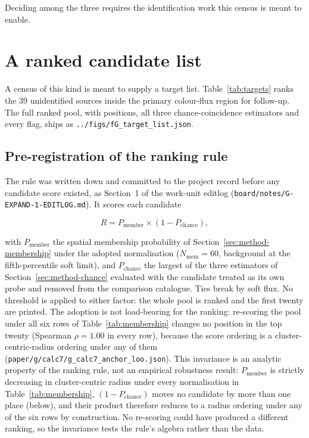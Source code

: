 \documentclass[11pt]{article}
\newcommand{\pchance}{\ensuremath{P_{\mathrm{chance}}}}
\begin{document}
Deciding among the three requires the identification work this census is meant to enable.

\section{A ranked candidate list}
\label{sec:targets}

A census of this kind is meant to supply a target list.
Table~\ref{tab:targets} ranks the 39 unidentified sources
inside the primary colour-flux region for follow-up. The full ranked pool, with
positions, all three chance-coincidence estimators and every flag, ships as
\texttt{../figs/fG\_target\_list.json}.

\subsection{Pre-registration of the ranking rule}
\label{sec:targets-rule}

The rule was written down and committed to the project record before any candidate
score existed, as Section~1 of the work-unit editlog
(\texttt{board/notes/G-EXPAND-1-EDITLOG.md}). It scores each candidate

\begin{equation}
R = P_{\mathrm{member}} \times \left(1 - \pchance{}\right),
\end{equation}

with $P_{\mathrm{member}}$ the spatial membership probability of
Section~\ref{sec:method-membership} under the adopted normalisation
($N_{\mathrm{mem}} = 60$, background at the fifth-percentile soft limit), and
\pchance{} the largest of the three estimators of Section~\ref{sec:method-chance}
evaluated with the candidate treated as its own probe and removed from the
comparison catalogue. Ties break by soft flux. No threshold is applied to either
factor: the whole pool is ranked and the first twenty are printed. The adoption is
not load-bearing for the ranking: re-scoring the pool under all six rows of
Table~\ref{tab:membership} changes no position in the top twenty (Spearman
$\rho = 1.00$ in every row), because the score ordering is a cluster-centric-radius
ordering under any of them (\texttt{paper/g/calc7/g\_calc7\_anchor\_loo.json}). This
invariance is an analytic property of the ranking rule, not an empirical robustness
result: $P_{\mathrm{member}}$ is strictly decreasing in cluster-centric radius under
every normalisation in Table~\ref{tab:membership}, $(1-\pchance{})$ moves no
candidate by more than one place (below), and their product therefore reduces to a
radius ordering under any of the six rows by construction. No re-scoring could have
produced a different ranking, so the invariance tests the rule's algebra rather than
the data.
\end{document}
